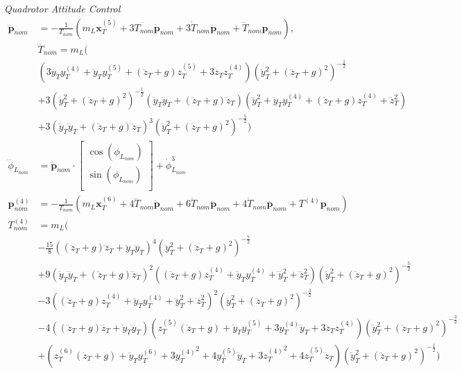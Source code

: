 \documentclass[11pt]{article}
\begin{document}
\emph{Quadrotor Attitude Control}
\begin{align*}
\mathbf{\dddot{p}}_{nom} &= - \frac{1}{T_{nom}} \left( m_L \mathbf{x}_T^{(5)} + 3 \ddot{T_{nom}} \mathbf{\dot{p}}_{nom} + 3 \dot{T}_{nom} \mathbf{\ddot{p}}_{nom} + \dddot{T}_{nom} \mathbf{p}_{nom} \right), \\
& \dddot{T}_{nom} = m_L ( \\
& (3 \dddot{y}_T y_T^{(4)} + \ddot{y}_T y_T^{(5)} + (\ddot{z}_T + g) z_T^{(5)} + 3 \dddot{z}_T z_T^{(4)} ) ( \ddot{y}_T^2 + (\ddot{z}_T+g)^2)^{ -\frac{1}{2} } \\
& + 3 ( \ddot{y}_T^2 + (\ddot{z}_T+g)^2) ^{-\frac{1}{2}} (\ddot{y}_T \dddot{y}_T + (\ddot{z}_T+g) \dddot{z}_T) ( \dddot{y}_T^2 + \ddot{y}_T y_T^{(4)} + (\ddot{z}_T+g) z_T^{(4)} + \dddot{z}_T^2) \\
& + 3 ( \ddot{y}_T \dddot{y}_T + (\ddot{z}_T+g) \dddot{z}_T)^3 (\ddot{y}_T^2 + (\ddot{z}_T+g)^2 ) ^ {-\frac{5}{2}} ) \\
\dddot{\phi}_{L_{nom}} &= \mathbf{\dddot{p}}_{nom} \cdot
\begin{bmatrix}
       \cos(\phi_{L_{nom}}) \\
       \sin(\phi_{L_{nom}}) \\
\end{bmatrix} 
+ \dot{\phi}_{L_{nom}}^3 \\
\mathbf{{p}}^{(4)}_{nom} &= - \frac{1}{T_{nom}} ( m_L \mathbf{x}_T^{(6)} + 4 \dddot{T}_{nom} \mathbf{\dot{p}}_{nom} + 6 \ddot{T}_{nom} \mathbf{\ddot{p}}_{nom} + 4 \dot{T}_{nom} \mathbf{\dddot{p}}_{nom} + T^{(4)} \mathbf{p}_{nom} ) \\
T^{(4)}_{nom} &= m_L ( \\
& -\frac{15}{8} ( (\ddot{z}_T+g) \dddot{z}_T + \ddot{y}_T \dddot{y}_T) ^4 ( \ddot{y}_T^2 + (\ddot{z}_T+g)^2) ^ {-\frac{7}{2}} \\
& + 9 ( \ddot{y}_T \dddot{y}_T + (\ddot{z}_T+g) \dddot{z}_T) ^2 ( (\ddot{z}_T+g) z_T^{(4)} + \ddot{y}_T y_T^{(4)} + \dddot{y}_T^2 + \dddot{z}_T^2) ( \ddot{y}_T^2 + (\ddot{z}_T+g)^2)^{-\frac{5}{2}} \\
& - 3 ( (\ddot{z}_T+g) z_T^{(4)} + \ddot{y}_T y_T^{(4)} + \dddot{y}_T^2 + \dddot{z}_T^2) ^2 (\ddot{y}_T^2 + (\ddot{z}_T+g)^2)^{-\frac{3}{2}} \\
& - 4 ( (\ddot{z}_T+g) \dddot{z}_T + \ddot{y}_T \dddot{y}_T)( z_T^{(5)}(\ddot{z}_T+g) + \ddot{y}_T y_T^{(5)} + 3 y_T^{(4)} \dddot{y}_T + 3 \dddot{z}_T z_T^{(4)} ) ( \ddot{y}_T^2 + (\ddot{z}_T+g)^2)^{-\frac{3}{2}} \\
& + ( z_T^{(6)}(\ddot{z}_T+g)+ \ddot{y}_T y_T^{(6)} + 3 {y_T^{(4)}}^2 + 4 y_T^{(5)}\dddot{y}_T + 3 {z_T^{(4)}}^2 + 4 z_T^{(5)}\dddot{z}_T) (\ddot{y}_T^2 + (\ddot{z}_T+g)^2)^{-\frac{1}{2}} )  \\

\end{align*}
\end{document}
